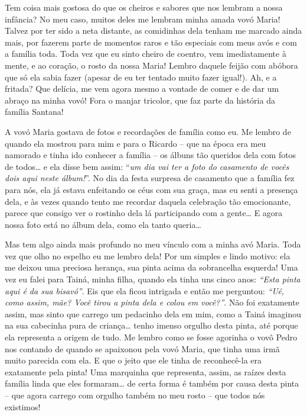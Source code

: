 \documentclass[
  brazil,
  a6paper,
  oneside,
  landscape,
  14pt]{scrbook}
\begin{document}
Tem coisa mais gostosa do que os cheiros e sabores que nos lembram a
nossa infância? No meu caso, muitos deles me lembram minha amada vovó
Maria! Talvez por ter sido a neta distante, as comidinhas dela tenham me
marcado ainda mais, por fazerem parte de momentos raros e tão especiais
com meus avós e com a família toda. Toda vez que eu sinto cheiro de
coentro, vem imediatamente à mente, e ao coração, o rosto da nossa
Maria! Lembro daquele feijão com abóbora que só ela sabia fazer (apesar
de eu ter tentado muito fazer igual!). Ah, e a fritada? Que delícia, me
vem agora mesmo a vontade de comer e de dar um abraço na minha vovó!
Fora o manjar tricolor, que faz parte da história da família Santana!

A vovó Maria gostava de fotos e recordações de família como eu. Me
lembro de quando ela mostrou para mim e para o Ricardo -- que na época
era meu namorado e tinha ido conhecer a família -- os álbuns tão
queridos dela com fotos de todos\ldots{} e ela disse bem assim:
``\emph{um dia vai ter a foto do casamento de vocês dois aqui neste
álbum!}''. No dia da festa surpresa de casamento que a família fez para
nós, ela já estava enfeitando os céus com sua graça, mas eu senti a
presença dela, e às vezes quando tento me recordar daquela celebração
tão emocionante, parece que consigo ver o rostinho dela lá participando
com a gente\ldots{} E agora nossa foto está no álbum dela, como ela
tanto queria\ldots{}

Mas tem algo ainda mais profundo no meu vínculo com a minha avó Maria.
Toda vez que olho no espelho eu me lembro dela! Por um simples e lindo
motivo: ela me deixou uma preciosa herança, sua pinta acima da
sobrancelha esquerda! Uma vez eu falei para Tainá, minha filha, quando
ela tinha uns cinco anos: \emph{``Esta pinta aqui é da sua bisavó''}.
Eis que ela ficou intrigada e então me perguntou: \emph{``Ué, como
assim, mãe? Você tirou a pinta dela e colou em você?''}. Não foi
exatamente assim, mas sinto que carrego um pedacinho dela em mim, como a
Tainá imaginou na sua cabecinha pura de criança\ldots{} tenho imenso
orgulho desta pinta, até porque ela representa a origem de tudo. Me
lembro como se fosse agorinha o vovô Pedro nos contando de quando se
apaixonou pela vovó Maria, que tinha uma irmã muito parecida com ela. E
que o jeito que ele tinha de reconhecê-la era exatamente pela pinta! Uma
marquinha que representa, assim, as raízes desta família linda que eles
formaram\ldots{} de certa forma é também por causa desta pinta -- que
agora carrego com orgulho também no meu rosto -- que todos nós
existimos!
\end{document}

